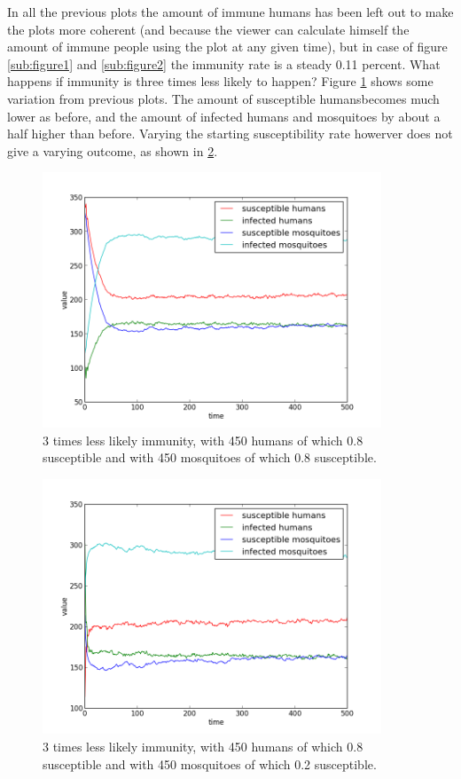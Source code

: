 \documentclass[a4paper]{report}
\begin{document}
In all the previous plots the amount of immune humans has been left out to make
the plots more coherent (and because the viewer can calculate himself the amount
of immune people using the plot at any given time), but in case of figure
\ref{sub:figure1} and \ref{sub:figure2} the immunity rate is a steady 0.11
percent. What happens if immunity is three times less likely to happen? Figure
\ref{fig:less_immunity_05_08_05_08} shows some variation from previous plots.
The amount of susceptible humansbecomes much lower as before, and the amount of
infected humans and mosquitoes by about a half higher than before. Varying the
starting susceptibility rate howerver does not give a varying outcome, as shown
in \ref{fig:less_immunity_05_08_05_02}.


\begin{figure}[htbp]
    \centering
    \includegraphics[width=0.9\textwidth]{less_immunity_05_08_05_08.png}
    \caption{3 times less likely immunity, with 450 humans of which 0.8
        susceptible and with 450 mosquitoes of which 0.8 susceptible.
    }
    \label{fig:less_immunity_05_08_05_08}
\end{figure}

\begin{figure}[htbp]
    \centering
    \includegraphics[width=0.9\textwidth]{less_immunity_05_08_05_02.png}
    \caption{3 times less likely immunity, with 450 humans of which 0.8
        susceptible and with 450 mosquitoes of which 0.2 susceptible.
    }
    \label{fig:less_immunity_05_08_05_02}
\end{figure}
\end{document}
